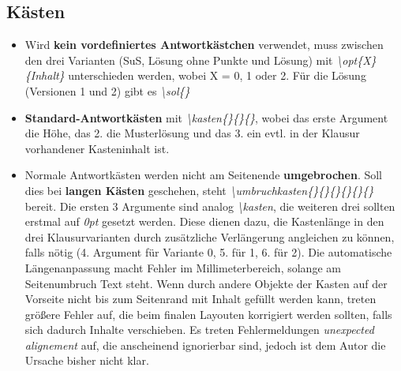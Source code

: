 \documentclass[../main.tex]{subfiles}
\begin{document}
\subsection{Kästen}
\begin{itemize}
    \item Wird \textbf{kein vordefiniertes Antwortk\"astchen} verwendet, muss zwischen den drei Varianten (SuS, L\"osung ohne Punkte und L\"osung) mit \textit{\textbackslash opt\{X\}\{Inhalt\}} unterschieden werden, wobei X = 0, 1 oder 2. F\"ur die L\"osung (Versionen 1 und 2) gibt es \hypertarget{sol}{\textit{\textbackslash sol\{\}}}
    \item \textbf{Standard-Antwortk\"asten} mit \textit{\hypertarget{kasten}{\textbackslash kasten\{\}\{\}\{\}}}, wobei das erste Argument die H\"ohe, das 2. die Musterl\"osung und das 3. ein evtl. in der Klausur vorhandener Kasteninhalt ist.
    \item Normale Antwortk\"asten werden nicht am Seitenende \textbf{umgebrochen}. Soll dies bei \textbf{langen K\"asten} geschehen, steht \hypertarget{umbruchkasten}{\textit{\textbackslash umbruchkasten\{\}\{\}\{\}\{\}\{\}\{\}}} bereit. Die ersten 3 Argumente sind analog \textit{\textbackslash kasten}, die weiteren drei sollten erstmal auf \textit{0pt} gesetzt werden. Diese dienen dazu, die Kastenl\"ange in den drei Klausurvarianten durch zus\"atzliche Verl\"angerung angleichen zu k\"onnen, falls n\"otig (4. Argument f\"ur Variante 0, 5. f\"ur 1, 6. f\"ur 2). Die automatische L\"angenanpassung macht Fehler im Millimeterbereich, solange am Seitenumbruch Text steht. Wenn durch andere Objekte der Kasten auf der Vorseite nicht bis zum Seitenrand mit Inhalt gef\"ullt werden kann, treten gr\"o\ss{}ere Fehler auf, die beim finalen Layouten korrigiert werden sollten, falls sich dadurch Inhalte verschieben. Es treten Fehlermeldungen \textit{unexpected alignement} auf, die anscheinend ignorierbar sind, jedoch ist dem Autor die Ursache bisher nicht klar.

\end{itemize}
\end{document}

